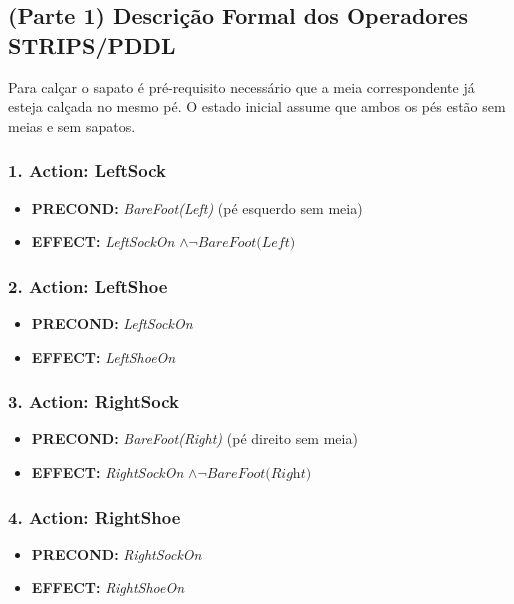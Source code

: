 \documentclass[a4paper,12pt]{article}
\begin{document}
\bigskip


\subsection*{(Parte 1) Descrição Formal dos Operadores STRIPS/PDDL}

Para calçar o sapato é pré-requisito necessário que a meia correspondente já esteja calçada no mesmo pé. O estado inicial assume que ambos os pés estão sem meias e sem sapatos.

\subsubsection*{1. Action: LeftSock}
\begin{itemize}
	\item \textbf{PRECOND:} \textit{BareFoot(Left)} (pé esquerdo sem meia)
	\item \textbf{EFFECT:} \textit{LeftSockOn} $\wedge \neg \textit{BareFoot(Left)}$
\end{itemize}

\subsubsection*{2. Action: LeftShoe}
\begin{itemize}
	\item \textbf{PRECOND:} \textit{LeftSockOn}
	\item \textbf{EFFECT:} \textit{LeftShoeOn}
\end{itemize}

\subsubsection*{3. Action: RightSock}
\begin{itemize}
	\item \textbf{PRECOND:} \textit{BareFoot(Right)} (pé direito sem meia)
	\item \textbf{EFFECT:} \textit{RightSockOn} $\wedge \neg \textit{BareFoot(Right)}$
\end{itemize}

\subsubsection*{4. Action: RightShoe}
\begin{itemize}
	\item \textbf{PRECOND:} \textit{RightSockOn}
	\item \textbf{EFFECT:} \textit{RightShoeOn}
\end{itemize}
\end{document}
